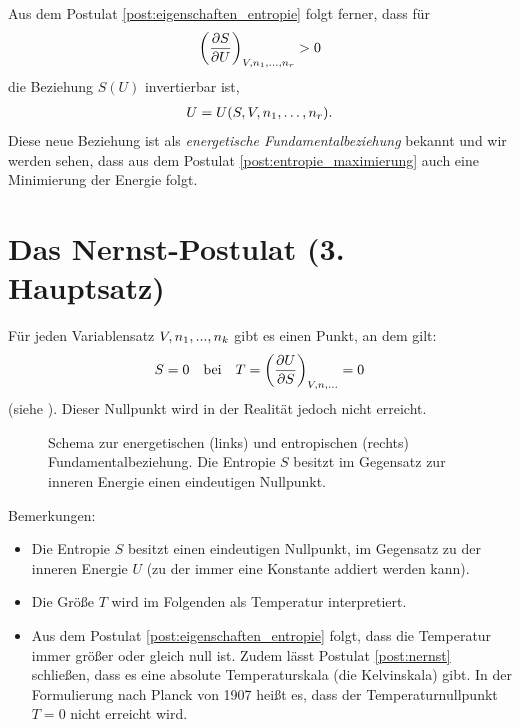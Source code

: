 Aus dem Postulat \ref{post:eigenschaften_entropie} folgt ferner, dass für
\begin{align*}
    \left(\frac{\partial S}{\partial U}\right)_{V,n_1, \dots ,n_r} > 0
\end{align*}
die Beziehung $S(U)$ invertierbar ist,
\begin{align*}
    U = U(S,V,n_1, \dots,n_r).
\end{align*}
Diese neue Beziehung ist als \emph{energetische Fundamentalbeziehung} bekannt und wir werden sehen, dass aus dem Postulat \ref{post:entropie_maximierung} auch eine Minimierung der Energie folgt.



\section{Das Nernst-Postulat (3. Hauptsatz)}



\begin{postulate}
    \label{post:nernst}
    Für jeden Variablensatz $V,n_1,...,n_k$ gibt es einen Punkt, an dem gilt:
    \begin{align}
        \label{eq:nernst_postulat}
        S = 0 \quad \text{bei} \quad T =\left(\frac{\partial U}{\partial S}\right)_{V,n,...}=0
    \end{align}
    (siehe ). Dieser Nullpunkt wird in der Realität jedoch nicht erreicht. 
\end{postulate}

\begin{figure}[H]
    \centering
    \tfigSchemaFundamentalbeziehung
    \caption{Schema zur energetischen (links) und entropischen (rechts) Fundamentalbeziehung. Die Entropie $S$ besitzt im Gegensatz zur inneren Energie einen eindeutigen Nullpunkt.  }
    \label{fig:SchemaFundamentalbeziehung}
\end{figure}

Bemerkungen:
\begin{itemize}
    \item Die Entropie $S$ besitzt einen eindeutigen Nullpunkt, im Gegensatz zu der inneren Energie $U$ (zu der immer eine Konstante addiert werden kann).
    \item Die Größe $T$ wird im Folgenden als Temperatur interpretiert.
    \item Aus dem Postulat \ref{post:eigenschaften_entropie} folgt, dass die Temperatur immer größer oder gleich null ist. Zudem lässt Postulat \ref{post:nernst} schließen, dass es eine absolute Temperaturskala (die Kelvinskala) gibt.
    In der Formulierung nach Planck von 1907 heißt es, dass der Temperaturnullpunkt $T=0$ nicht erreicht wird.
\end{itemize}


